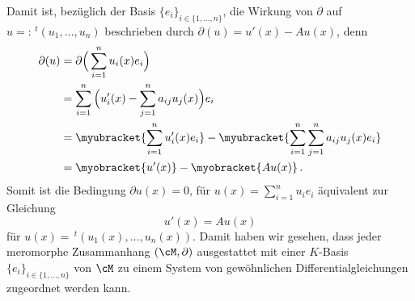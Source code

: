 Damit ist, bezüglich der Basis $\{e_i\}_{i\in\{1,\dots,n\}}$, die Wirkung von
$\partial$ auf $u=:\,^t(u_1,\dots,u_n)$ beschrieben durch
$\partial(u)=u'(x) - Au(x)$, denn
\begin{align*}
\partial(u) &= \partial \Big( \sum_{i=1}^nu_i(x)e_i \Big)
\\&=\sum_{i=1}^n \Big( u_i'(x)-\sum_{j=1}^na_{ij}u_j(x) \Big)e_i
\\&=\myubracket{\sum_{i=1}^n u_i'(x)e_i}
- \myubracket{\sum_{i=1}^n\sum_{j=1}^na_{ij}u_j(x)e_i}
\\&=\myobracket{u'(x)} - \myobracket{Au(x)} \,.
\end{align*}
Somit ist die Bedingung $\partial u(x)=0$, für $u(x)= \sum_{i=1}^n u_ie_i$
äquivalent zur Gleichung
\begin{equation*}
u'(x)=Au(x)
\end{equation*}
für $u(x)=\,^t(u_1(x),\dots,u_n(x))$. Damit haben wir gesehen,
dass jeder meromorphe Zusammanhang $(\cM,\partial)$ ausgestattet mit einer
$K$-Basis $\{e_i\}_{i\in\{1,\dots,n\}}$ von $\cM$ zu einem System von
gewöhnlichen Differentialgleichungen zugeordnet werden kann.

\begin{comment}
\begin{prop}[Transformationsformel] \cite[Chap 5.1.1]{hotta2007d}
In der Situation
\begin{center}
\begin{tikzpicture} [scale=3.3, descr/.style={fill=white,inner sep=2.5pt} ]
\matrix (m) [
matrix of math nodes
, row sep=3em
, column sep=3em
]
{
K^r &   &   & K^r \\
    & M & M & \\
K^r &   &   & K^r \\
};
\path[->,font=\scriptsize,>=angle 90]
(m-1-1) edge node[descr]{$\cong$} node[above]{$\phi$} (m-2-2)
(m-3-1) edge node[descr]{$\cong$} node[above]{$\psi$} (m-2-2)
(m-1-4) edge node[descr]{$\cong$} node[above]{$\phi$} (m-2-3)
(m-3-4) edge node[descr]{$\cong$} node[above]{$\psi$} (m-2-3)

(m-2-2) edge node[above]{$\partial$} (m-2-3)

(m-1-1) edge node[above]{$\frac{d}{dz}+A$} (m-1-4)
(m-3-1) edge node[above]{$\frac{d}{dz}+B$} (m-3-4)

(m-3-1) edge node[descr]{$\cong$} node[right]{$T$} (m-1-1)
(m-3-4) edge node[descr]{$\cong$} node[left]{$T$} (m-1-4)
;

\path[>=stealth,|->]
;
\end{tikzpicture}
\end{center}
mit $\phi,\psi$ und $T$ $K$-Linear und $\partial,(\frac{d}{dx}+A)$ und
$(\frac{d}{dx}+B)$ $\C$-Linear, gilt:\\
Der meromorphe Zusammenhang. $\frac{d}{dx}+A$ auf $K^r$ wird durch
Basiswechsel
$T\in GL(r,K)$ zu
\[
\frac{d}{dx}+(T^{-1}\cdot T'+T^{-1}AT) = \frac{d}{dx}+B
\]
\end{prop}
\end{comment}


